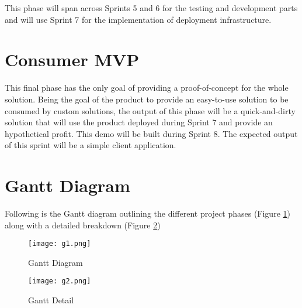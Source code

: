 This phase will span across Sprints 5 and 6 for the testing and development parts and will use Sprint 7 for the implementation of deployment infrastructure.

\section{Consumer MVP}
This final phase has the only goal of providing a proof-of-concept for the whole solution. Being the goal of the product to provide an easy-to-use solution to be consumed by custom solutions, the output of this phase will be a quick-and-dirty solution that will use the product deployed during Sprint 7 and provide an hypothetical profit. This demo will be built during Sprint 8. The expected output of this sprint will be a simple client application.

\section{Gantt Diagram}
Following is the Gantt diagram outlining the different project phases (Figure \ref{fig:ganttdiagram}) along with a detailed breakdown (Figure \ref{fig:ganttdetail})

\begin{figure}
	\centering
		\texttt{[image: g1.png]}
	\caption{Gantt Diagram}
	\label{fig:ganttdiagram}
\end{figure}

\begin{figure}
	\centering
		\texttt{[image: g2.png]}
	\caption{Gantt Detail}
	\label{fig:ganttdetail}
\end{figure}